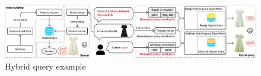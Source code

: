 \documentclass[sigconf, nonacm]{acmart}
\begin{document}
\begin{sloppypar}
\begin{figure}
    \centering
    \setlength{\abovecaptionskip}{0cm}
    \setlength{\belowcaptionskip}{-0.4cm}
    \includegraphics[width=\textwidth]{figures/hybrid ANNS.pdf}
    \caption{Hybrid query example}
    \label{fig:hybrid ANNS}
\end{figure}

\end{sloppypar}
\end{document}
